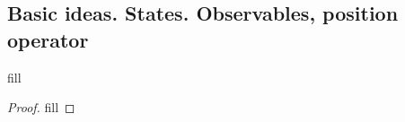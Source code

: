 \subsection{Basic ideas. States. Observables, position operator}

\begin{exercise}{1}
fill
\end{exercise}
\begin{proof}
fill
\end{proof}